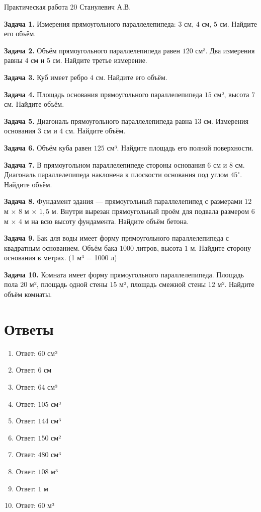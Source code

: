 \documentclass{umk-matematika}
\begin{document}
\maketitlepage
    {Практическая работа 20}
    {}
    {Станулевич А.В.}

\textbf{Задача 1.} Измерения прямоугольного параллелепипеда: $3$ см, $4$ см, $5$ см. Найдите его объём.\par\vspace{10pt}
\textbf{Задача 2.} Объём прямоугольного параллелепипеда равен $120$ см³. Два измерения равны $4$ см и $5$ см. Найдите третье измерение.\par\vspace{10pt}
\textbf{Задача 3.} Куб имеет ребро $4$ см. Найдите его объём.\par\vspace{10pt}
\textbf{Задача 4.} Площадь основания прямоугольного параллелепипеда $15$ см², высота $7$ см. Найдите объём.\par\vspace{10pt}
\textbf{Задача 5.} Диагональ прямоугольного параллелепипеда равна $13$ см. Измерения основания $3$ см и $4$ см. Найдите объём.\par\vspace{10pt}
\textbf{Задача 6.} Объём куба равен $125$ см³. Найдите площадь его полной поверхности.\par\vspace{10pt}
\textbf{Задача 7.} В прямоугольном параллелепипеде стороны основания $6$ см и $8$ см. Диагональ параллелепипеда наклонена к плоскости основания под углом $45^\circ$. Найдите объём.\par\vspace{10pt}
\textbf{Задача 8.} Фундамент здания — прямоугольный параллелепипед с размерами $12$ м $\times$ $8$ м $\times$ $1{,}5$ м. Внутри вырезан прямоугольный проём для подвала размером $6$ м $\times$ $4$ м на всю высоту фундамента. Найдите объём бетона.\par\vspace{10pt}
\textbf{Задача 9.} Бак для воды имеет форму прямоугольного параллелепипеда с квадратным основанием. Объём бака $1000$ литров, высота $1$ м. Найдите сторону основания в метрах. (1 м³ = 1000 л)\par\vspace{10pt}
\textbf{Задача 10.} Комната имеет форму прямоугольного параллелепипеда. Площадь пола $20$ м², площадь одной стены $15$ м², площадь смежной стены $12$ м². Найдите объём комнаты.\par\vspace{10pt}
\newpage
\section*{Ответы}

\begin{enumerate}
  \item Ответ: $60$ см³
  \item Ответ: $6$ см
  \item Ответ: $64$ см³
  \item Ответ: $105$ см³
  \item Ответ: $144$ см³
  \item Ответ: $150$ см²
  \item Ответ: $480$ см³
  \item Ответ: $108$ м³
  \item Ответ: $1$ м
  \item Ответ: $60$ м³
\end{enumerate}
\end{document}
